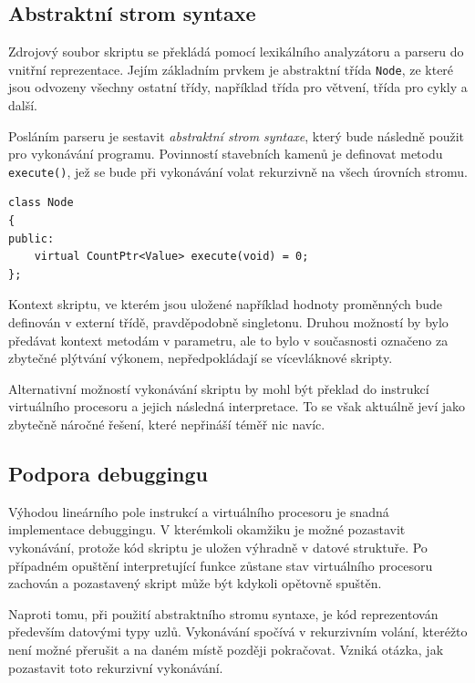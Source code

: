 \documentclass[11pt,twoside,a4paper]{book}
\begin{document}
\subsection{Abstraktní strom syntaxe}
\label{abstraktni_strom_syntaxe}

Zdrojový soubor skriptu se překládá pomocí lexikálního analyzátoru a parseru do vnitřní reprezentace. Jejím základním prvkem je abstraktní třída \texttt{Node}, ze které jsou odvozeny všechny ostatní třídy, například třída pro větvení, třída pro cykly a další.

Posláním parseru je sestavit \textit{abstraktní strom syntaxe}, který bude následně použit pro vykonávání programu. Povinností stavebních kamenů je definovat metodu \texttt{execute()}, jež se bude při vykonávání volat rekurzivně na všech úrovních stromu.

\begin{verbatim}
class Node
{
public:
    virtual CountPtr<Value> execute(void) = 0;
};
\end{verbatim}

Kontext skriptu, ve kterém jsou uložené například hodnoty proměnných bude definován v externí třídě, pravděpodobně singletonu. Druhou možností by bylo předávat kontext metodám v parametru, ale to bylo v současnosti označeno za zbytečné plýtvání výkonem, nepředpokládají se vícevláknové skripty.

Alternativní možností vykonávání skriptu by mohl být překlad do instrukcí virtuálního procesoru a jejich následná interpretace. To se však aktuálně jeví jako zbytečně náročné řešení, které nepřináší téměř nic navíc.


\subsection{Podpora debuggingu}
\label{podpora_debuggingu}

Výhodou lineárního pole instrukcí a virtuálního procesoru je snadná implementace de\-bug\-gin\-gu. V kterémkoli okamžiku je možné pozastavit vykonávání, protože kód skriptu je uložen výhradně v datové struktuře. Po případném opuštění interpretující funkce zůstane stav vir\-tu\-ál\-ní\-ho procesoru zachován a pozastavený skript může být kdykoli opětovně spuštěn.

Naproti tomu, při použití abstraktního stromu syntaxe, je kód reprezentován především datovými typy uzlů. Vykonávání spočívá v rekurzivním volání, kteréžto není možné přerušit a na daném místě později pokračovat. Vzniká otázka, jak pozastavit toto rekurzivní vykonávání.
\end{document}
